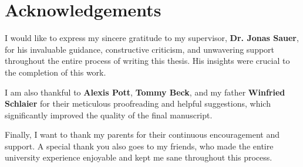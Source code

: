 \chapter*{Acknowledgements}
I would like to express my sincere gratitude to my supervisor, \textbf{Dr. Jonas Sauer}, for his invaluable guidance, constructive criticism, and unwavering support throughout the entire process of writing this thesis. His insights were crucial to the completion of this work.

I am also thankful to \textbf{Alexis Pott}, \textbf{Tommy Beck}, and my father \textbf{Winfried Schlaier} for their meticulous proofreading and helpful suggestions, which significantly improved the quality of the final manuscript.

Finally, I want to thank my parents for their continuous encouragement and support.
A special thank you also goes to my friends, who made the entire university experience enjoyable and kept me sane throughout this process.



